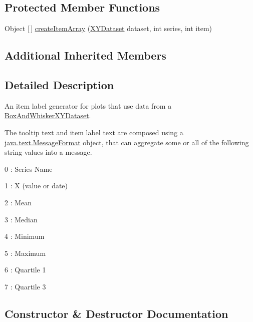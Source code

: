 \subsection*{Protected Member Functions}
\begin{DoxyCompactItemize}
\item 
Object \mbox{[}$\,$\mbox{]} \mbox{\hyperlink{classorg_1_1jfree_1_1chart_1_1labels_1_1_box_and_whisker_x_y_tool_tip_generator_a90a2ceb326a36f39f93c1f96addd727c}{create\+Item\+Array}} (\mbox{\hyperlink{interfaceorg_1_1jfree_1_1data_1_1xy_1_1_x_y_dataset}{X\+Y\+Dataset}} dataset, int series, int item)
\end{DoxyCompactItemize}
\subsection*{Additional Inherited Members}


\subsection{Detailed Description}
An item label generator for plots that use data from a \mbox{\hyperlink{}{Box\+And\+Whisker\+X\+Y\+Dataset}}. 

The tooltip text and item label text are composed using a \mbox{\hyperlink{}{java.\+text.\+Message\+Format}} object, that can aggregate some or all of the following string values into a message. 
\begin{DoxyItemize}
\item 0 \+: Series Name 
\item 1 \+: X (value or date) 
\item 2 \+: Mean 
\item 3 \+: Median 
\item 4 \+: Minimum 
\item 5 \+: Maximum 
\item 6 \+: Quartile 1 
\item 7 \+: Quartile 3 
\end{DoxyItemize}

\subsection{Constructor \& Destructor Documentation}
\mbox{\label{classorg_1_1jfree_1_1chart_1_1labels_1_1_box_and_whisker_x_y_tool_tip_generator_a71cc48d241117acfa4c90036a6ff571c}} 
